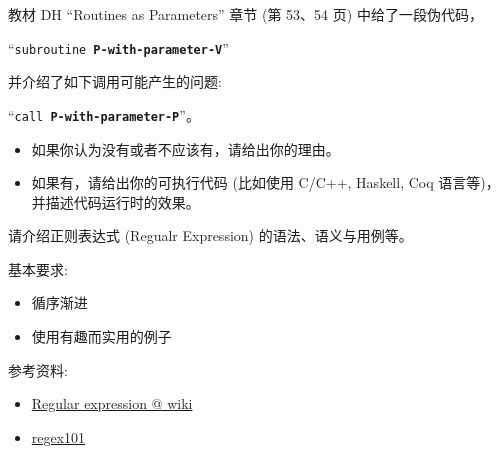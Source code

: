 \documentclass[a4paper, justified]{tufte-handout}
\begin{document}
\begin{problem}[``It is Ridiculous!'']
  教材 DH ``Routines as Parameters'' 章节 (第 53、54 页) 中给了一段伪代码， \\
  \begin{center}
    {``\texttt{subroutine {\bf P-with-parameter-V}}''}
  \end{center}
  并介绍了如下调用可能产生的问题: \\
  \begin{center}
    {``\texttt{call {\bf P-with-parameter-P}}''}。
  \end{center}

  \begin{itemize}
    \item 如果你认为没有或者不应该有，请给出你的理由。
    \item 如果有，请给出你的可执行代码 (比如使用 C/C++, Haskell, Coq 语言等)，
      并描述代码运行时的效果。
  \end{itemize}
\end{problem}

\begin{solution}
\end{solution}

\beginot

\begin{ot}[正则表达式]
  请介绍正则表达式 (Regualr Expression) 的语法、语义与用例等。

  \noindent 基本要求:
  \begin{itemize}
    \item 循序渐进
    \item 使用有趣而实用的例子
  \end{itemize}

  \noindent 参考资料:
  \begin{itemize}
    \item \href{https://en.wikipedia.org/wiki/Regular\_expression}{Regular expression @ wiki}
    \item \href{https://regex101.com/}{regex101}
  \end{itemize}
\end{ot}
\end{document}

